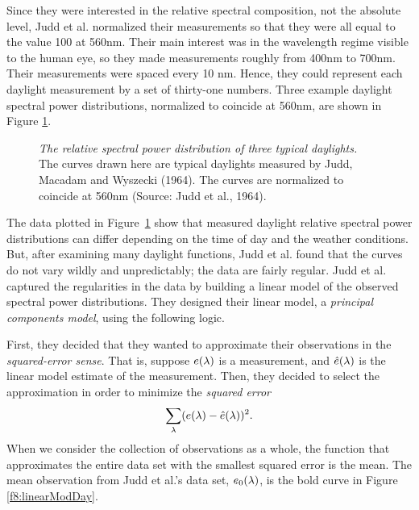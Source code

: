 Since they were interested in the relative spectral composition, not
the absolute level, Judd et al. normalized their measurements so that
they were all equal to the value 100 at 560nm.  Their main interest
was in the wavelength regime visible to the human eye, so they made
measurements roughly from 400nm to 700nm.  Their measurements were
spaced every 10 nm.  Hence, they could represent each daylight
measurement by a set of thirty-one numbers.  Three example daylight
spectral power distributions, normalized to coincide at 560nm, are
shown in Figure \ref{f8:daylights}.
\begin{figure}
\centerline{
}
\caption[Examples of Daylights]{
{\em The relative spectral power distribution of three typical
daylights.}  The curves drawn here are typical daylights measured by
Judd, Macadam and Wyszecki (1964).  The curves are normalized to
coincide at 560nm (Source:  Judd et al., 1964).
}
\label{f8:daylights}
\end{figure}

The data plotted in Figure~\ref{f8:daylights} show that measured
daylight relative spectral power distributions can differ depending on
the time of day and the weather conditions.  But, after examining many
daylight functions, Judd et al. found that the curves do not vary
wildly and unpredictably; the data are fairly regular.  Judd et
al. captured the regularities in the data by building a linear model
of the observed spectral power distributions.  They designed their
linear model, a {\em principal components model}, using the following
logic.

First, they decided that they wanted to approximate their observations
in the {\em squared-error sense}.  That is, suppose $\mbox{$e(\lambda)$}$ is
a measurement, and $\mbox{$\hat{e}(\lambda)$}$ is the linear model estimate of
the measurement.  Then, they decided to select the approximation in
order to minimize the {\em squared error}
\[
\sum_{\lambda} ( \mbox{$e(\lambda)$} - \mbox{$\hat{e}(\lambda)$} )^2 .
\]
When we consider the collection of observations as a whole, the
function that approximates the entire data set with the smallest
squared error is the mean.  The mean observation from Judd et al.'s
data set, $\mbox{$e_{0}(\lambda)$}$, is the bold curve in Figure
\ref{f8:linearModDay}.

